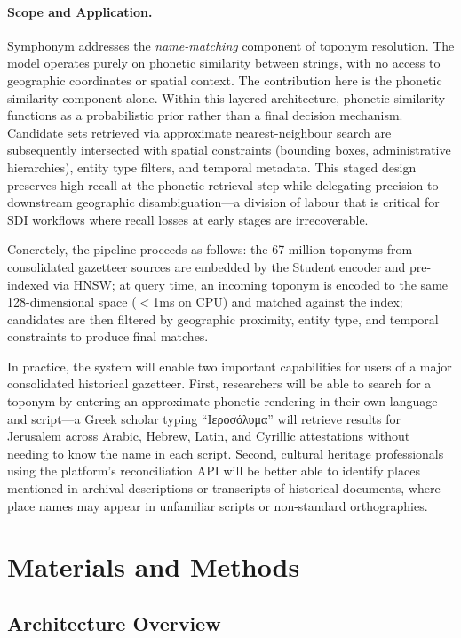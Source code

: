 \documentclass[11pt,a4paper]{article}
\begin{document}
\paragraph{Scope and Application.} Symphonym addresses the \emph{name-matching} component of toponym resolution. The model operates purely on phonetic similarity between strings, with no access to geographic coordinates or spatial context. The contribution here is the phonetic similarity component alone. Within this layered architecture, phonetic similarity functions as a probabilistic prior rather than a final decision mechanism. Candidate sets retrieved via approximate nearest-neighbour search are subsequently intersected with spatial constraints (bounding boxes, administrative hierarchies), entity type filters, and temporal metadata. This staged design preserves high recall at the phonetic retrieval step while delegating precision to downstream geographic disambiguation---a division of labour that is critical for SDI workflows where recall losses at early stages are irrecoverable.

Concretely, the pipeline proceeds as follows: the 67 million toponyms from consolidated gazetteer sources are embedded by the Student encoder and pre-indexed via HNSW; at query time, an incoming toponym is encoded to the same 128-dimensional space ($<$1ms on CPU) and matched against the index; candidates are then filtered by geographic proximity, entity type, and temporal constraints to produce final matches.

In practice, the system will enable two important capabilities for users of a major consolidated historical gazetteer. First, researchers will be able to search for a toponym by entering an approximate phonetic rendering in their own language and script---a Greek scholar typing ``Ιεροσόλυμα'' will retrieve results for Jerusalem across Arabic, Hebrew, Latin, and Cyrillic attestations without needing to know the name in each script. Second, cultural heritage professionals using the platform's reconciliation API will be better able to identify places mentioned in archival descriptions or transcripts of historical documents, where place names may appear in unfamiliar scripts or non-standard orthographies.


\section{Materials and Methods}
\label{sec:methods}

\subsection{Architecture Overview}
\end{document}
